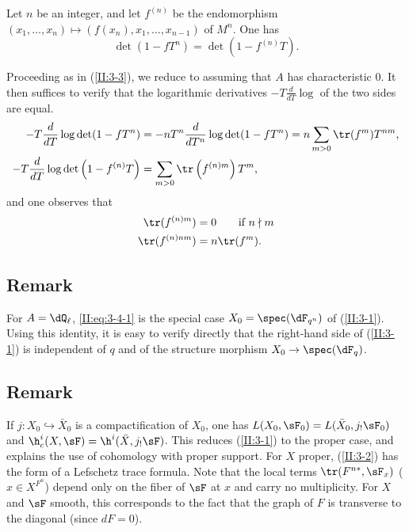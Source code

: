 \documentclass[oneside]{book}
\begin{document}
\begin{corollary_}\label{II:3-4}
Let $n$ be an integer, and let $f^{(n)}$ be the endomorphism
$(x_1,\dotsc,x_n)\mapsto \left(f(x_n),x_1,\dotsc,x_{n-1}\right)$ of $M^n$.
One has
\begin{equation*}\tag{3.4.1}\label{II:eq:3-4-1}
  \det(1-f T^n) = \det(1-f^{(n)} T) \text{.}
\end{equation*}
\end{corollary_}

Proceeding as in (\ref{II:3-3}), we reduce to assuming that $A$ has
characteristic $0$. It then suffices to verify that the logarithmic
derivatives $-T\frac{d}{dT}\log$ of the two sides are equal.
\begin{align*}
  -T\frac{d}{dT}\log\det(1-f T^n) &= - n T^n \frac{d}{dT^n} \log\det(1-f T^n) = n \sum_{m>0} \tr(f^m) T^{n m} \text{,} \\
  -T \frac{d}{dT}\log\det\left(1-f^{(n)} T\right) &= \sum_{m>0} \tr\left(f^{(n) m}\right) T^m \text{,}
\end{align*}
and one observes that
\begin{align*}
  \tr(f^{(n) m}) &= 0 \qquad \text{if $n\nmid m$} \\
  \tr(f^{(n) n m}) &= n \tr(f^m) \text{.}
\end{align*}






\subsection{Remark}\label{II:3-5}

For $A=\dQ_\ell$, \eqref{II:eq:3-4-1} is the special case
$X_0=\spec(\dF_{q^n})$ of (\ref{II:3-1}). Using this identity, it is easy to
verify directly that the right-hand side of (\ref{II:3-1}) is independent of
$q$ and of the structure morphism $X_0\to\spec(\dF_q)$.






\subsection{Remark}\label{II:3-6}

If $j:X_0\hookrightarrow \bar X_0$ is a compactification of $X_0$, one has
$L(X_0,\sF_0) = L(\bar X_0, j_!\sF_0)$ and
$\h_c^i(X,\sF) = \h^i(\bar X,j_!\sF)$. This reduces (\ref{II:3-1}) to the
proper case, and explains the use of cohomology with proper support. For $X$
proper, (\ref{II:3-2}) has the form of a Lefschetz trace formula. Note that
the local terms $\tr(F^{n *},\sF_x)$ ($x\in X^{F^n}$) depend only on the
fiber of $\sF$ at $x$ and carry no multiplicity. For $X$ and $\sF$ smooth,
this corresponds to the fact that the graph of $F$ is transverse to the
diagonal (since $d F = 0$).
\end{document}
